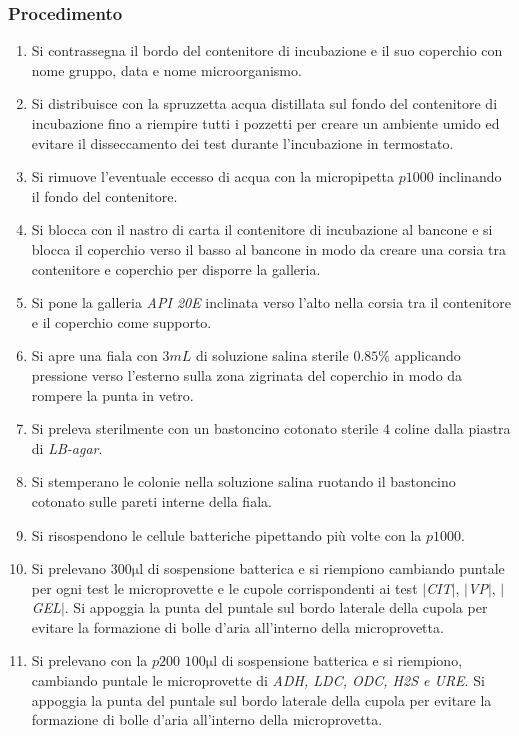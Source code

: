 		\subsubsection{Procedimento}
		\begin{enumerate}
			\item Si contrassegna il bordo del contenitore di incubazione e il suo coperchio con nome gruppo, data e nome microorganismo.
			\item Si distribuisce con la spruzzetta acqua distillata sul fondo del contenitore di incubazione fino a riempire tutti i pozzetti per creare un ambiente umido ed evitare il disseccamento dei test durante l'incubazione in termostato.
			\item Si rimuove l'eventuale eccesso di acqua con la micropipetta $p1000$ inclinando il fondo del contenitore.
			\item Si blocca con il nastro di carta il contenitore di incubazione al bancone e si blocca il coperchio verso il basso al bancone in modo da creare una corsia tra contenitore e coperchio per disporre la galleria.
			\item Si pone la galleria \emph{API 20E} inclinata verso l'alto nella corsia tra il contenitore e il coperchio come supporto.
			\item Si apre una fiala con $3\si{mL}$ di soluzione salina sterile $0.85\%$ applicando pressione verso l'esterno sulla zona zigrinata del coperchio in modo da rompere la punta in vetro.
			\item Si preleva sterilmente con un bastoncino cotonato sterile $4$ coline dalla piastra di \emph{LB-agar}.
			\item Si stemperano le colonie nella soluzione salina ruotando il bastoncino cotonato sulle pareti interne della fiala.
			\item Si risospendono le cellule batteriche pipettando pi\`u volte con la $p1000$.
			\item Si prelevano $300\si{\micro\litre}$ di sospensione batterica e si riempiono cambiando puntale per ogni test le microprovette e le cupole corrispondenti ai test \emph{$|$CIT$|$}, \emph{$|$VP$|$}, \emph{$|$GEL$|$}.
				Si appoggia la punta del puntale sul bordo laterale della cupola per evitare la formazione di bolle d'aria all'interno della microprovetta.
			\item Si prelevano con la $p200$ $100\si{\micro\litre}$ di sospensione batterica e si riempiono, cambiando puntale le microprovette di \emph{ADH, LDC, ODC, H2S e URE}.
				Si appoggia la punta del puntale sul bordo laterale della cupola per evitare la formazione di bolle d'aria all'interno della microprovetta.

\end{enumerate}
